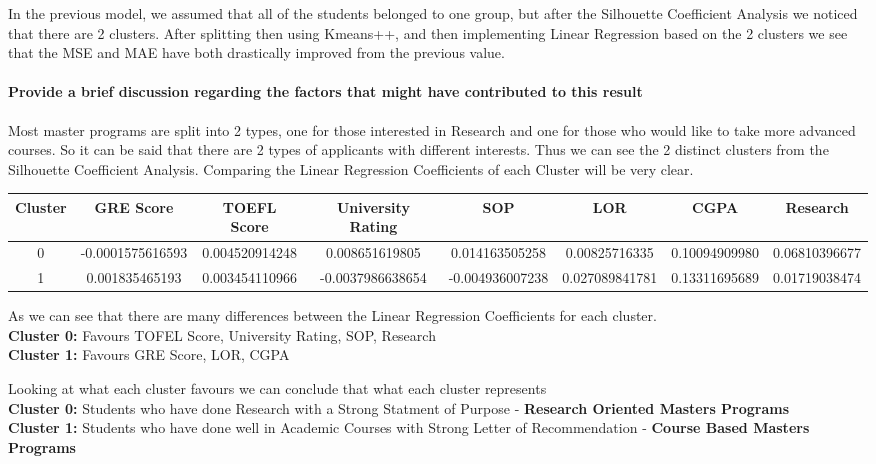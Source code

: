\documentclass[8pt]{extarticle}
\begin{document}
In the previous model, we assumed that all of the students belonged to one
group, but after the Silhouette Coefficient Analysis we noticed that
there are 2 clusters. After splitting then using Kmeans++, and then
implementing Linear Regression based on the 2 clusters we see that the
MSE and MAE have both drastically improved from the previous value.

    \hypertarget{provide-a-brief-discussion-regarding-the-factors-that-might-have-contributed-to-this-result}{%
\paragraph{Provide a brief discussion regarding the factors that might
have contributed to this
result}\label{provide-a-brief-discussion-regarding-the-factors-that-might-have-contributed-to-this-result}}

Most master programs are split into 2 types, one for those interested in
Research and one for those who would like to take more advanced courses.
So it can be said that there are 2 types of applicants with different
interests. Thus we can see the 2 distinct clusters from the Silhouette
Coefficient Analysis. Comparing the Linear Regression Coefficients of
each Cluster will be very clear.

\begin{center}
\begin{tabular}{|c|c|c|c|c|c|c|c| }
  \hline
    Cluster & GRE Score & TOEFL Score & University Rating & SOP & LOR & CGPA & Research \\
  \hline
    0 & -0.0001575616593 & 0.004520914248 & 0.008651619805 & 0.014163505258 & 0.00825716335 & 0.10094909980 & 0.06810396677 \\
  \hline
    1 & 0.001835465193 & 0.003454110966 & -0.0037986638654 & -0.004936007238 & 0.027089841781 & 0.13311695689 & 0.01719038474 \\
  \hline
\end{tabular}
\end{center}

As we can see that there are many differences between the Linear
Regression Coefficients for each cluster.\\
\textbf{Cluster 0:} Favours TOFEL Score, University Rating, SOP,
Research\\
\textbf{Cluster 1:} Favours GRE Score, LOR, CGPA

Looking at what each cluster favours we can conclude that what each
cluster represents\\
\textbf{Cluster 0:} Students who have done Research with a Strong
Statment of Purpose - \textbf{Research Oriented Masters Programs}\\
\textbf{Cluster 1:} Students who have done well in Academic Courses with
Strong Letter of Recommendation - \textbf{Course Based Masters Programs}
\end{document}
